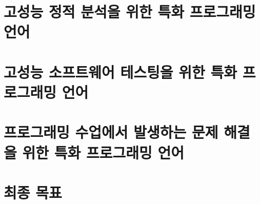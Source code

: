 \documentclass[11pt]{article}
\begin{document}
\begin{spacing}{1.145}
\section{고성능 정적 분석을 위한 특화 프로그래밍 언어}




\section{고성능 소프트웨어 테스팅을 위한 특화 프로그래밍 언어}



\section{프로그래밍 수업에서 발생하는 문제 해결을 위한 특화 프로그래밍 언어}



\section{최종 목표}




\end{spacing}





\end{document}
